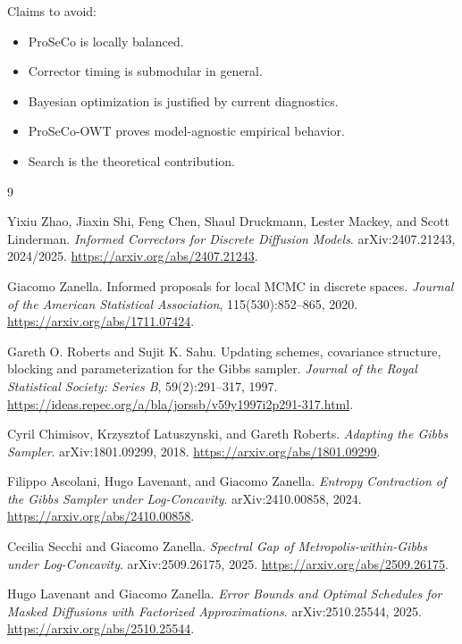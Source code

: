 \documentclass[11pt]{article}
\newcommand{\1}{\mathbf 1}
\begin{document}
Claims to avoid:

\begin{itemize}[leftmargin=1.5em]
\item ProSeCo is locally balanced.
\item Corrector timing is submodular in general.
\item Bayesian optimization is justified by current diagnostics.
\item ProSeCo-OWT proves model-agnostic empirical behavior.
\item Search is the theoretical contribution.
\end{itemize}

\begin{thebibliography}{9}

Yixiu Zhao, Jiaxin Shi, Feng Chen, Shaul Druckmann, Lester Mackey, and Scott
Linderman.
\newblock \emph{Informed Correctors for Discrete Diffusion Models}.
\newblock arXiv:2407.21243, 2024/2025.
\newblock \url{https://arxiv.org/abs/2407.21243}.

Giacomo Zanella.
\newblock Informed proposals for local MCMC in discrete spaces.
\newblock \emph{Journal of the American Statistical Association},
115(530):852--865, 2020.
\newblock \url{https://arxiv.org/abs/1711.07424}.

Gareth O. Roberts and Sujit K. Sahu.
\newblock Updating schemes, covariance structure, blocking and parameterization
for the Gibbs sampler.
\newblock \emph{Journal of the Royal Statistical Society: Series B},
59(2):291--317, 1997.
\newblock \url{https://ideas.repec.org/a/bla/jorssb/v59y1997i2p291-317.html}.

Cyril Chimisov, Krzysztof Latuszynski, and Gareth Roberts.
\newblock \emph{Adapting the Gibbs Sampler}.
\newblock arXiv:1801.09299, 2018.
\newblock \url{https://arxiv.org/abs/1801.09299}.

Filippo Ascolani, Hugo Lavenant, and Giacomo Zanella.
\newblock \emph{Entropy Contraction of the Gibbs Sampler under Log-Concavity}.
\newblock arXiv:2410.00858, 2024.
\newblock \url{https://arxiv.org/abs/2410.00858}.

Cecilia Secchi and Giacomo Zanella.
\newblock \emph{Spectral Gap of Metropolis-within-Gibbs under Log-Concavity}.
\newblock arXiv:2509.26175, 2025.
\newblock \url{https://arxiv.org/abs/2509.26175}.

Hugo Lavenant and Giacomo Zanella.
\newblock \emph{Error Bounds and Optimal Schedules for Masked Diffusions with
Factorized Approximations}.
\newblock arXiv:2510.25544, 2025.
\newblock \url{https://arxiv.org/abs/2510.25544}.

\end{thebibliography}
\end{document}
